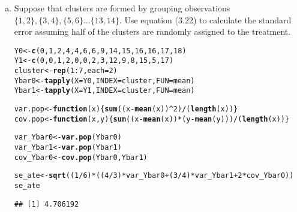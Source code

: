 \documentclass[11pt,notitlepage]{article}\usepackage[]{graphicx}\usepackage[]{color}
\makeatletter
\newcommand{\hlnum}[1]{\textcolor[rgb]{0.686,0.059,0.569}{#1}}%
\newcommand{\hlopt}[1]{\textcolor[rgb]{0,0,0}{#1}}%
\newcommand{\hlstd}[1]{\textcolor[rgb]{0.345,0.345,0.345}{#1}}%
\newcommand{\hlkwa}[1]{\textcolor[rgb]{0.161,0.373,0.58}{\textbf{#1}}}%
\newcommand{\hlkwb}[1]{\textcolor[rgb]{0.69,0.353,0.396}{#1}}%
\newcommand{\hlkwc}[1]{\textcolor[rgb]{0.333,0.667,0.333}{#1}}%
\newcommand{\hlkwd}[1]{\textcolor[rgb]{0.737,0.353,0.396}{\textbf{#1}}}%
\newenvironment{kframe}{%
 \def\at@end@of@kframe{}%
 \ifinner\ifhmode%
  \def\at@end@of@kframe{\end{minipage}}%
  \begin{minipage}{\columnwidth}%
 \fi\fi%
 \def\FrameCommand##1{\hskip\@totalleftmargin \hskip-\fboxsep
 \colorbox{shadecolor}{##1}\hskip-\fboxsep
     \hskip-\linewidth \hskip-\@totalleftmargin \hskip\columnwidth}%
 \MakeFramed {\advance\hsize-\width
   \@totalleftmargin\z@ \linewidth\hsize
   \@setminipage}}%
 {\par\unskip\endMakeFramed%
 \at@end@of@kframe}
\newenvironment{knitrout}{}{} %
\makeatother
\begin{document}
\begin{enumerate}[a)]
\item Suppose that clusters are formed by grouping observations $\{1,2\},\{3,4\},\{5,6\}\ldots\{13,14\}$.  Use equation (3.22) to calculate the standard error assuming half of the clusters are randomly assigned to the treatment.

\begin{knitrout}
\color{fgcolor}\begin{kframe}
\begin{alltt}
\hlstd{Y0} \hlkwb{<-} \hlkwd{c}\hlstd{(}\hlnum{0}\hlstd{,}\hlnum{1}\hlstd{,}\hlnum{2}\hlstd{,}\hlnum{4}\hlstd{,}\hlnum{4}\hlstd{,}\hlnum{6}\hlstd{,}\hlnum{6}\hlstd{,}\hlnum{9}\hlstd{,}\hlnum{14}\hlstd{,}\hlnum{15}\hlstd{,}\hlnum{16}\hlstd{,}\hlnum{16}\hlstd{,}\hlnum{17}\hlstd{,}\hlnum{18}\hlstd{)}
\hlstd{Y1} \hlkwb{<-} \hlkwd{c}\hlstd{(}\hlnum{0}\hlstd{,}\hlnum{0}\hlstd{,}\hlnum{1}\hlstd{,}\hlnum{2}\hlstd{,}\hlnum{0}\hlstd{,}\hlnum{0}\hlstd{,}\hlnum{2}\hlstd{,}\hlnum{3}\hlstd{,}\hlnum{12}\hlstd{,}\hlnum{9}\hlstd{,}\hlnum{8}\hlstd{,}\hlnum{15}\hlstd{,}\hlnum{5}\hlstd{,}\hlnum{17}\hlstd{)}
\hlstd{cluster} \hlkwb{<-} \hlkwd{rep}\hlstd{(}\hlnum{1}\hlopt{:}\hlnum{7}\hlstd{,} \hlkwc{each}\hlstd{=}\hlnum{2}\hlstd{)}
\hlstd{Ybar0} \hlkwb{<-} \hlkwd{tapply}\hlstd{(}\hlkwc{X}\hlstd{=Y0,} \hlkwc{INDEX}\hlstd{=cluster,} \hlkwc{FUN}\hlstd{=mean)}
\hlstd{Ybar1} \hlkwb{<-} \hlkwd{tapply}\hlstd{(}\hlkwc{X}\hlstd{=Y1,} \hlkwc{INDEX}\hlstd{=cluster,} \hlkwc{FUN}\hlstd{=mean)}

\hlstd{var.pop} \hlkwb{<-} \hlkwa{function}\hlstd{(}\hlkwc{x}\hlstd{)\{}\hlkwd{sum}\hlstd{((x}\hlopt{-}\hlkwd{mean}\hlstd{(x))}\hlopt{^}\hlnum{2}\hlstd{)}\hlopt{/}\hlstd{(}\hlkwd{length}\hlstd{(x))\}}
\hlstd{cov.pop} \hlkwb{<-} \hlkwa{function}\hlstd{(}\hlkwc{x}\hlstd{,}\hlkwc{y}\hlstd{)\{}\hlkwd{sum}\hlstd{((x}\hlopt{-}\hlkwd{mean}\hlstd{(x))}\hlopt{*}\hlstd{(y}\hlopt{-}\hlkwd{mean}\hlstd{(y)))}\hlopt{/}\hlstd{(}\hlkwd{length}\hlstd{(x))\}}

\hlstd{var_Ybar0} \hlkwb{<-} \hlkwd{var.pop}\hlstd{(Ybar0)}
\hlstd{var_Ybar1} \hlkwb{<-} \hlkwd{var.pop}\hlstd{(Ybar1)}
\hlstd{cov_Ybar0} \hlkwb{<-} \hlkwd{cov.pop}\hlstd{(Ybar0,Ybar1)}

\hlstd{se_ate} \hlkwb{<-} \hlkwd{sqrt}\hlstd{((}\hlnum{1}\hlopt{/}\hlnum{6}\hlstd{)} \hlopt{*} \hlstd{((}\hlnum{4}\hlopt{/}\hlnum{3}\hlstd{)}\hlopt{*}\hlstd{var_Ybar0} \hlopt{+} \hlstd{(}\hlnum{3}\hlopt{/}\hlnum{4}\hlstd{)}\hlopt{*}\hlstd{var_Ybar1} \hlopt{+} \hlnum{2}\hlopt{*}\hlstd{cov_Ybar0))}
\hlstd{se_ate}
\end{alltt}
\begin{verbatim}
## [1] 4.706192
\end{verbatim}
\end{kframe}
\end{knitrout}


\end{enumerate}
\end{document}
